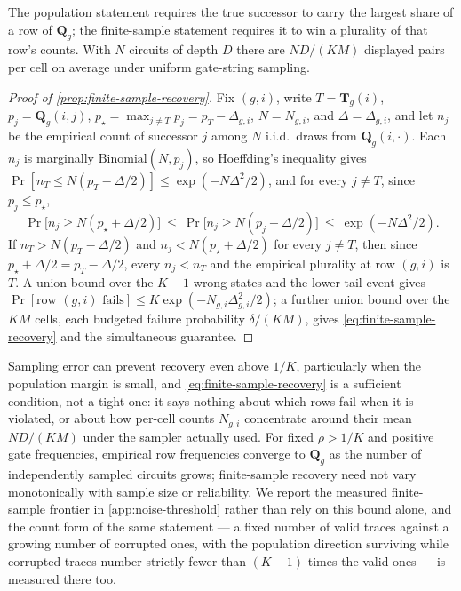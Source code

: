 The population statement requires the true successor to carry the largest
share of a row of $\bm{Q}_g$; the finite-sample statement requires it to win a
plurality of that row's counts.  With $N$ circuits of depth $D$ there are
$ND/(KM)$ displayed pairs per cell on average under uniform gate-string
sampling.

\begin{proof}[Proof of \cref{prop:finite-sample-recovery}]
Fix $(g,i)$, write $T=\bm{T}_g(i)$, $p_j=\bm{Q}_g(i,j)$,
$p_\star=\max_{j\ne T}p_j=p_T-\Delta_{g,i}$, $N=N_{g,i}$, and $\Delta=\Delta_{g,i}$,
and let $n_j$ be the empirical count of successor $j$ among $N$ i.i.d.\ draws
from $\bm{Q}_g(i,\cdot)$. Each $n_j$ is marginally $\mathrm{Binomial}(N,p_j)$,
so Hoeffding's inequality gives $\Pr[n_T\le N(p_T-\Delta/2)]\le\exp(-N\Delta^2/2)$,
and for every $j\ne T$, since $p_j\le p_\star$,
\[
 \Pr\bigl[n_j\ge N(p_\star+\Delta/2)\bigr]
 \ \le\ \Pr\bigl[n_j\ge N(p_j+\Delta/2)\bigr]
 \ \le\ \exp(-N\Delta^2/2).
\]
If $n_T>N(p_T-\Delta/2)$ and $n_j<N(p_\star+\Delta/2)$ for every $j\ne T$, then
since $p_\star+\Delta/2=p_T-\Delta/2$, every $n_j<n_T$ and the empirical
plurality at row $(g,i)$ is $T$. A union bound over the $K-1$ wrong states
and the lower-tail event gives
$\Pr[\text{row }(g,i)\text{ fails}]\le K\exp(-N_{g,i}\Delta_{g,i}^2/2)$; a
further union bound over the $KM$ cells, each budgeted failure probability
$\delta/(KM)$, gives \cref{eq:finite-sample-recovery} and the simultaneous
guarantee.
\end{proof}

Sampling error can prevent recovery even above $1/K$, particularly
when the population margin is small, and \cref{eq:finite-sample-recovery}
is a sufficient condition, not a tight one: it says nothing about which
rows fail when it is violated, or about how per-cell counts $N_{g,i}$
concentrate around their mean $ND/(KM)$ under the sampler actually used.
For fixed $\rho>1/K$ and positive gate
frequencies, empirical row frequencies converge to $\bm{Q}_g$ as the number of
independently sampled circuits grows; finite-sample recovery need not vary
monotonically with sample size or reliability.  We report the measured
finite-sample frontier in \cref{app:noise-threshold} rather than rely on
this bound alone, and the count form of the same statement --- a fixed
number of valid traces against a growing number of corrupted ones, with the
population direction surviving while corrupted traces number strictly fewer
than $(K-1)$ times the valid ones --- is measured there too.

